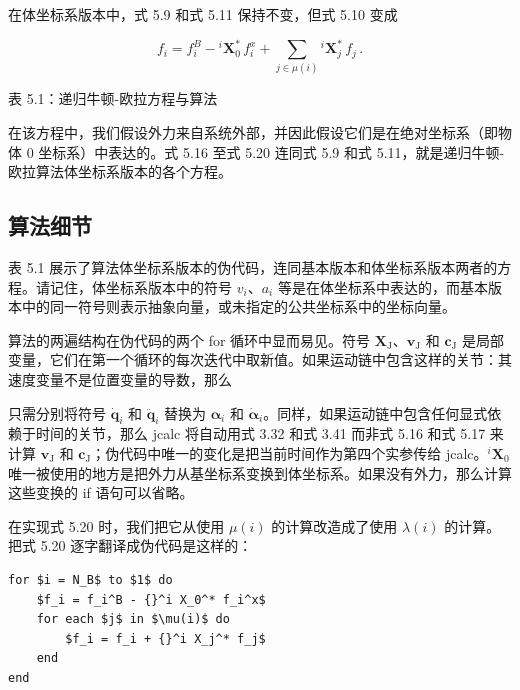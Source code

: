 \documentclass[10pt,a4paper]{book}
\theoremstyle{thmstyle} %
\theoremstyle{defstyle} %
\theoremstyle{prostyle} %
\begin{document}
在体坐标系版本中，式 5.9 和式 5.11 保持不变，但式 5.10 变成



$$
f _ { i } = f _ { i } ^{B} - { } ^{i} \mathbf { X } _ { 0 } ^{*} \, f _ { i } ^{x} + \sum _ { j \in \mu ( i ) } { } ^{i} \mathbf { X } _ { j } ^{*} \, f _ { j } \, .
$$



表 5.1：递归牛顿-欧拉方程与算法





在该方程中，我们假设外力来自系统外部，并因此假设它们是在绝对坐标系（即物体 0 坐标系）中表达的。式 5.16 至式 5.20 连同式 5.9 和式 5.11，就是递归牛顿-欧拉算法体坐标系版本的各个方程。



\subsection{算法细节}





表 5.1 展示了算法体坐标系版本的伪代码，连同基本版本和体坐标系版本两者的方程。请记住，体坐标系版本中的符号 $v_i$、$a_i$ 等是在体坐标系中表达的，而基本版本中的同一符号则表示抽象向量，或未指定的公共坐标系中的坐标向量。



算法的两遍结构在伪代码的两个 for 循环中显而易见。符号 $\mathbf{X}_{\mathrm{J}}$、$\mathbf{v}_{\mathrm{J}}$ 和 $\mathbf{c}_{\mathrm{J}}$ 是局部变量，它们在第一个循环的每次迭代中取新值。如果运动链中包含这样的关节：其速度变量不是位置变量的导数，那么



只需分别将符号 $\dot{\boldsymbol{q}}_{i}$ 和 $\ddot{\boldsymbol{q}}_{i}$ 替换为 $\boldsymbol{\alpha}_{i}$ 和 $\dot{\boldsymbol{\alpha}}_{i}$。同样，如果运动链中包含任何显式依赖于时间的关节，那么 jcalc 将自动用式 3.32 和式 3.41 而非式 5.16 和式 5.17 来计算 $\boldsymbol{v}_{\mathrm{J}}$ 和 $\boldsymbol{c}_{\mathrm{J}}$；伪代码中唯一的变化是把当前时间作为第四个实参传给 jcalc。$^{i}\boldsymbol{X}_{0}$ 唯一被使用的地方是把外力从基坐标系变换到体坐标系。如果没有外力，那么计算这些变换的 if 语句可以省略。



在实现式 5.20 时，我们把它从使用 $\mu(i)$ 的计算改造成了使用 $\lambda(i)$ 的计算。把式 5.20 逐字翻译成伪代码是这样的：



\begin{verbatim}
for $i = N_B$ to $1$ do
    $f_i = f_i^B - {}^i X_0^* f_i^x$
    for each $j$ in $\mu(i)$ do
        $f_i = f_i + {}^i X_j^* f_j$
    end
end
\end{verbatim}
\end{document}
